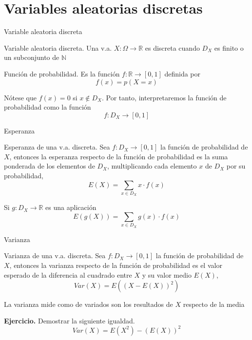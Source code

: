 \documentclass[
  ignorenonframetext,
]{beamer}
\begin{document}
\hypertarget{variables-aleatorias-discretas}{%
\section{Variables aleatorias
discretas}\label{variables-aleatorias-discretas}}

\begin{frame}{Variable aleatoria discreta}
\protect\hypertarget{variable-aleatoria-discreta}{}

Variable aleatoria discreta. Una v.a.
\(X:\Omega\longrightarrow \mathbb{R}\) es discreta cuando \(D_X\) es
finito o un subconjunto de \(\mathbb{N}\)

Función de probabilidad. Es la función
\(f:\mathbb{R}\longrightarrow[0,1]\) definida por \[f(x) = p(X=x)\]

Nótese que \(f(x)=0\) si \(x\not\in D_X\). Por tanto, interpretaremos la
función de probabilidad como la función \[f:D_X\longrightarrow [0,1]\]

\end{frame}

\begin{frame}{Esperanza}
\protect\hypertarget{esperanza}{}

Esperanza de una v.a. discreta. Sea \(f:D_X\longrightarrow[0,1]\) la
función de probabilidad de \(X\), entonces la esperanza respecto de la
función de probabilidad es la suma ponderada de los elementos de
\(D_X\), multiplicando cada elemento \(x\) de \(D_X\) por su
probabilidad, \[E(X) = \sum_{x\in D_X}x\cdot f(x)\]

Si \(g:D_X\longrightarrow \mathbb{R}\) es una aplicación
\[E(g(X))=\sum_{x\in D_X}g(x)\cdot f(x)\]

\end{frame}

\begin{frame}{Varianza}
\protect\hypertarget{varianza}{}

Varianza de una v.a. discreta. Sea \(f:D_X\longrightarrow[0,1]\) la
función de probabilidad de \(X\), entonces la varianza respecto de la
función de probabilidad es el valor esperado de la diferencia al
cuadrado entre \(X\) y su valor medio \(E(X)\),
\[Var(X)= E((X-E(X))^2) \]

La varianza mide como de variados son los resultados de \(X\) respecto
de la media

\textbf{Ejercicio.} Demostrar la siguiente igualdad.
\[Var(X)= E(X^2)-(E(X))^2\]

\end{frame}
\end{document}
